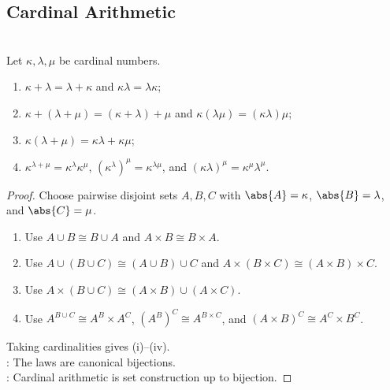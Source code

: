 \subsection{Cardinal Arithmetic}

\begin{proposition} \label{prop:cardinal-arithmetic-reference-laws} \\
Let $\kappa,\lambda,\mu$ be cardinal numbers.
\begin{enumerate}[label=(\roman*)]
\setlength{\itemsep}{0pt}
\item $\kappa+\lambda=\lambda+\kappa$ and $\kappa\lambda=\lambda\kappa$;
\item $\kappa+(\lambda+\mu)=(\kappa+\lambda)+\mu$ and $\kappa(\lambda\mu)=(\kappa\lambda)\mu$;
\item $\kappa(\lambda+\mu)=\kappa\lambda+\kappa\mu$;
\item $\kappa^{\lambda+\mu}=\kappa^\lambda\kappa^\mu$, $(\kappa^\lambda)^\mu=\kappa^{\lambda\mu}$, and $(\kappa\lambda)^\mu=\kappa^\mu\lambda^\mu$.
\end{enumerate}
\begin{proof}
Choose pairwise disjoint sets $A,B,C$ with $\abs{A}=\kappa$, $\abs{B}=\lambda$, and $\abs{C}=\mu$.
\begin{enumerate}[label=(\roman*)]
\setlength{\itemsep}{0pt}
\item Use $A\cup B\cong B\cup A$ and $A\times B\cong B\times A$.
\item Use $A\cup(B\cup C)\cong(A\cup B)\cup C$ and $A\times(B\times C)\cong(A\times B)\times C$.
\item Use $A\times(B\cup C)\cong(A\times B)\cup(A\times C)$.
\item Use $A^{B\cup C}\cong A^B\times A^C$, $(A^B)^C\cong A^{B\times C}$, and $(A\times B)^C\cong A^C\times B^C$.
\end{enumerate}
Taking cardinalities gives (i)--(iv).\\
: The laws are canonical bijections.\\
: Cardinal arithmetic is set construction up to bijection.
\end{proof}
\end{proposition}

